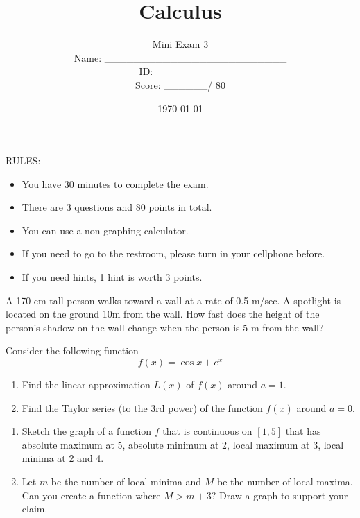 \documentclass[12pt]{amsart}
\title{ Calculus }
\author{  Mini Exam 3  \\ \vspace{1cm} Name: \_\_\_\_\_\_\_\_\_\_\_\_\_\_\_\_\_\_\_\_\_\_\_\_\_  
\\ \vspace{1cm} ID: \_\_\_\_\_\_\_\_\_ \\ \vspace{1cm} Score: \_\_\_\_\_\_/ 80}
\date{\today}
\begin{document}
\maketitle


RULES:
\begin{itemize}
	\item You have 30 minutes to complete the exam.
	\item There are 3 questions and 80 points in total.
	\item You can use a non-graphing calculator.
	\item If you need to go to the restroom, please turn in your cellphone before.
	\item If you need hints, 1 hint is worth 3 points.
\end{itemize}

\newpage

\begin{problem}[20 points]
A 170-cm-tall person walks toward a wall at a rate of  0.5 m/sec.
A spotlight is located on the ground 10m from the wall.
How fast does the height of the person’s shadow on the wall change when the person is 5 m from the wall?
\end{problem}

\newpage

\begin{problem}[20 points]
Consider the following function
$$ f(x) = \cos x + e^x $$
\begin{enumerate}
	\item Find the linear approximation $L(x)$ of $f(x)$ around $a = 1$.
	      \vspace{8cm}
	\item Find the Taylor series (to the 3rd power) of the function $f(x)$ around $a = 0$.
	      \vspace{8cm}
\end{enumerate}
\end{problem}

\newpage

\begin{problem}[20 points]
\begin{enumerate}
	\item Sketch the graph of a function $f$ that is continuous on $[1,5]$ that has absolute maximum at 5, absolute minimum at 2,   local maximum at 3, local minima at 2 and 4.
	      \vspace{8cm}
	\item Let $m$ be the number of local minima and  $M$ be the number of local maxima.
	      Can you create a function where  $M > m+ 3$? Draw a graph to support your claim.
\end{enumerate}
\end{problem}
\end{document}
